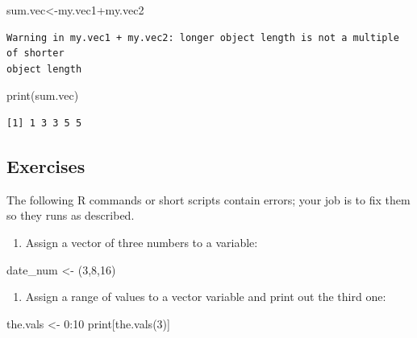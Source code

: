 \documentclass[
  letterpaper,
  DIV=11,
  numbers=noendperiod]{scrreprt}
\newenvironment{Shaded}{\begin{snugshade}}{\end{snugshade}}
\newcommand{\DecValTok}[1]{\textcolor[rgb]{0.68,0.00,0.00}{#1}}
\newcommand{\FunctionTok}[1]{\textcolor[rgb]{0.28,0.35,0.67}{#1}}
\newcommand{\NormalTok}[1]{\textcolor[rgb]{0.00,0.23,0.31}{#1}}
\newcommand{\OtherTok}[1]{\textcolor[rgb]{0.00,0.23,0.31}{#1}}
\newcommand{\SpecialCharTok}[1]{\textcolor[rgb]{0.37,0.37,0.37}{#1}}
\providecommand{\tightlist}{%
  \setlength{\itemsep}{0pt}\setlength{\parskip}{0pt}}\usepackage{longtable,booktabs,array}
\begin{document}
\begin{Shaded}
\begin{Highlighting}[]
\NormalTok{sum.vec}\OtherTok{\textless{}{-}}\NormalTok{my.vec1}\SpecialCharTok{+}\NormalTok{my.vec2}
\end{Highlighting}
\end{Shaded}

\begin{verbatim}
Warning in my.vec1 + my.vec2: longer object length is not a multiple of shorter
object length
\end{verbatim}

\begin{Shaded}
\begin{Highlighting}[]
\FunctionTok{print}\NormalTok{(sum.vec)}
\end{Highlighting}
\end{Shaded}

\begin{verbatim}
[1] 1 3 3 5 5
\end{verbatim}

\hypertarget{exercises-4}{%
\subsection{Exercises}\label{exercises-4}}

The following R commands or short scripts contain errors; your job is to
fix them so they runs as described.

\begin{enumerate}
\def\labelenumi{\arabic{enumi}.}
\tightlist
\item
  Assign a vector of three numbers to a variable:
\end{enumerate}

\begin{Shaded}
\begin{Highlighting}[]
\NormalTok{date\_num }\OtherTok{\textless{}{-}}\NormalTok{ (}\DecValTok{3}\NormalTok{,}\DecValTok{8}\NormalTok{,}\DecValTok{16}\NormalTok{)}
\end{Highlighting}
\end{Shaded}

\begin{enumerate}
\def\labelenumi{\arabic{enumi}.}
\setcounter{enumi}{1}
\tightlist
\item
  Assign a range of values to a vector variable and print out the third
  one:
\end{enumerate}

\begin{Shaded}
\begin{Highlighting}[]
\NormalTok{the.vals }\OtherTok{\textless{}{-}} \DecValTok{0}\SpecialCharTok{:}\DecValTok{10}
\NormalTok{print[}\FunctionTok{the.vals}\NormalTok{(}\DecValTok{3}\NormalTok{)]}
\end{Highlighting}
\end{Shaded}
\end{document}
